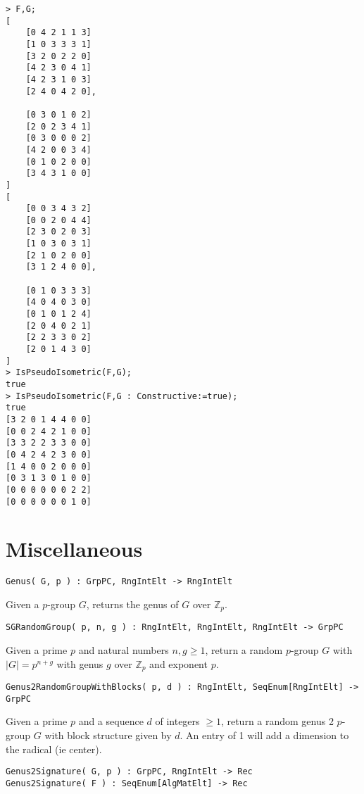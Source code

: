 \documentclass{documentation}
\begin{document}
\begin{lstlisting}[frame=single,basicstyle=\ttfamily\color{black!30!teal},backgroundcolor=\color{white!70!gray}]
> F,G;
[
    [0 4 2 1 1 3]
    [1 0 3 3 3 1]
    [3 2 0 2 2 0]
    [4 2 3 0 4 1]
    [4 2 3 1 0 3]
    [2 4 0 4 2 0],

    [0 3 0 1 0 2]
    [2 0 2 3 4 1]
    [0 3 0 0 0 2]
    [4 2 0 0 3 4]
    [0 1 0 2 0 0]
    [3 4 3 1 0 0]
]
[
    [0 0 3 4 3 2]
    [0 0 2 0 4 4]
    [2 3 0 2 0 3]
    [1 0 3 0 3 1]
    [2 1 0 2 0 0]
    [3 1 2 4 0 0],

    [0 1 0 3 3 3]
    [4 0 4 0 3 0]
    [0 1 0 1 2 4]
    [2 0 4 0 2 1]
    [2 2 3 3 0 2]
    [2 0 1 4 3 0]
]
> IsPseudoIsometric(F,G);
true
> IsPseudoIsometric(F,G : Constructive:=true);
true 
[3 2 0 1 4 4 0 0]
[0 0 2 4 2 1 0 0]
[3 3 2 2 3 3 0 0]
[0 4 2 4 2 3 0 0]
[1 4 0 0 2 0 0 0]
[0 3 1 3 0 1 0 0]
[0 0 0 0 0 0 2 2]
[0 0 0 0 0 0 1 0]
\end{lstlisting}

\chapter{Miscellaneous}

\color{blue}
\begin{verbatim}
Genus( G, p ) : GrpPC, RngIntElt -> RngIntElt
\end{verbatim}

\color{black}
Given a $p$-group $G$, returns the genus of $G$ over $\mathbb{Z}_p$.

\color{blue}
\begin{verbatim}
SGRandomGroup( p, n, g ) : RngIntElt, RngIntElt, RngIntElt -> GrpPC
\end{verbatim}

\color{black}
Given a prime $p$ and natural numbers $n,g\geq 1$, return a random $p$-group $G$ with $|G|=p^{n+g}$ with genus $g$ over $\mathbb{Z}_p$ and exponent $p$.

\color{blue}
\begin{verbatim}
Genus2RandomGroupWithBlocks( p, d ) : RngIntElt, SeqEnum[RngIntElt] -> GrpPC
\end{verbatim}

\color{black}
Given a prime $p$ and a sequence $d$ of integers $\geq 1$, return a random genus 2 $p$-group $G$ with block structure given by $d$. An entry of 1 will add a dimension to the radical (ie center).

\color{blue}
\begin{verbatim}
Genus2Signature( G, p ) : GrpPC, RngIntElt -> Rec
Genus2Signature( F ) : SeqEnum[AlgMatElt] -> Rec
\end{verbatim}
\end{document}
